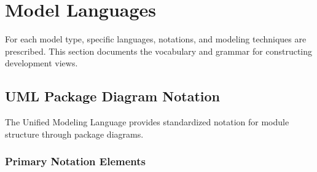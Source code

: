 \documentclass[11pt,letterpaper]{article}
\begin{document}
\section{Model Languages}

For each model type, specific languages, notations, and modeling techniques are prescribed. This section documents the vocabulary and grammar for constructing development views.

\subsection{UML Package Diagram Notation}

The Unified Modeling Language provides standardized notation for module structure through package diagrams.

\subsubsection{Primary Notation Elements}
\end{document}
